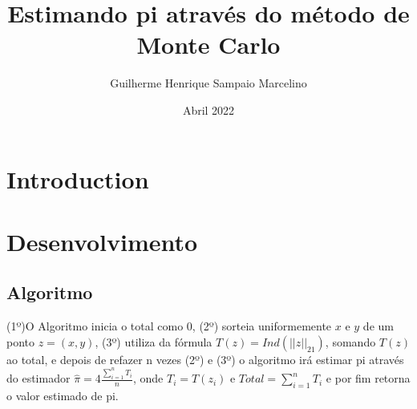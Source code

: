 \documentclass{article}
\title{Estimando pi através do método de Monte Carlo}
\author{Guilherme  Henrique Sampaio Marcelino}
\date{Abril 2022}
\begin{document}
\maketitle

\section{Introduction}

\section{Desenvolvimento}
\subsection{Algoritmo}
(1º)O Algoritmo inicia o total como 0, (2º) sorteia uniformemente $x$ e $y$ de um ponto $z=(x,y)$, (3º) utiliza da fórmula $T(z)=Ind(||z||_21)$, somando $T(z)$ ao total, e depois de refazer n vezes (2º) e (3º) o algoritmo irá estimar pi através do estimador $\hat{\pi}=4\frac{\sum_{i=1}^{n}T_i}{n}$, onde $T_i=T(z_i)$ e $Total=\sum_{i=1}^{n}T_i$ e por fim retorna o valor estimado de pi.
\end{document}
